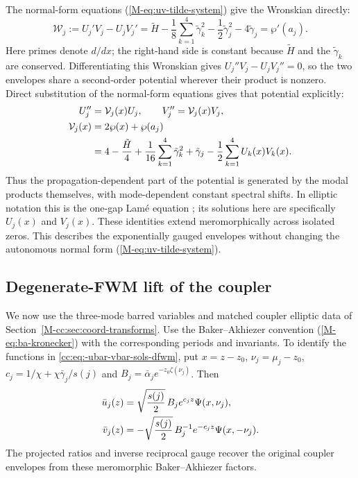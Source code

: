 \documentclass[11pt,a4paper]{article}
\newcommand{\externaleqref}[1]{\textup{(\ref*{#1})}}
\begin{document}
The normal-form equations \externaleqref{M-eq:uv-tilde-system} give the Wronskian directly:
\begin{equation}
\mathcal W_j:=U_j'V_j-U_jV_j'
=\tilde H-\frac18\sum_{k=1}^4\tilde\gamma_k^2
-\frac12\tilde\gamma_j^2-4\tilde\gamma_j
=\wp'(a_j).
\label{eq:ba-wronskian}
\end{equation}
Here primes denote $d/dx$; the right-hand side is constant because $\tilde H$ and the $\tilde\gamma_k$ are conserved.
Differentiating this Wronskian gives $U_j''V_j-U_jV_j''=0$, so the two envelopes share a second-order potential wherever their product is nonzero.
Direct substitution of the normal-form equations gives that potential explicitly:
\begin{align}
U_j''&=\mathcal V_j(x)U_j,\qquad
V_j''=\mathcal V_j(x)V_j,\notag\\
\mathcal V_j(x)&=2\wp(x)+\wp(a_j)\notag\\
&=4-\frac{\tilde H}{4}+\frac1{16}\sum_{k=1}^4\tilde\gamma_k^2
+\tilde\gamma_j-\frac12\sum_{k=1}^4 U_k(x)V_k(x).
\label{eq:ba-lame}
\end{align}
Thus the propagation-dependent part of the potential is generated by the modal products themselves, with mode-dependent constant spectral shifts.
In elliptic notation this is the one-gap Lam\'e equation \cite[Eq.~(1.9)]{kricheverEllipticSolutionsNonlinear1994}; its solutions here are specifically $U_j(x)$ and $V_j(x)$.
These identities extend meromorphically across isolated zeros.
This describes the exponentially gauged envelopes without changing the autonomous normal form \externaleqref{M-eq:uv-tilde-system}.

\subsection{Degenerate-FWM lift of the coupler}\label{supp:subsec:coupler-ba}
We now use the three-mode barred variables and matched coupler elliptic data of Section~\ref*{M-cc:sec:coord-transforms}.
Use the Baker--Akhiezer convention \externaleqref{M-eq:ba-kronecker} with the corresponding periods and invariants.
To identify the functions in \eqref{cc:eq:-ubar-vbar-sols-dfwm}, put $x=z-z_0$, $\nu_j=\mu_j-z_0$, $c_j=1/\chi+\chi\bar\gamma_j/s(j)$ and $B_j=\bar\alpha_j e^{-z_0\zeta(\nu_j)}$.
Then
\begin{align}
\bar u_j(z)&=\sqrt{\frac{s(j)}2}\,B_j e^{c_jz}\Psi(x,\nu_j),\notag\\
\bar v_j(z)&=-\sqrt{\frac{s(j)}2}\,B_j^{-1}e^{-c_jz}\Psi(x,-\nu_j).
\end{align}
The projected ratios and inverse reciprocal gauge recover the original coupler envelopes from these meromorphic Baker--Akhiezer factors.
\end{document}
